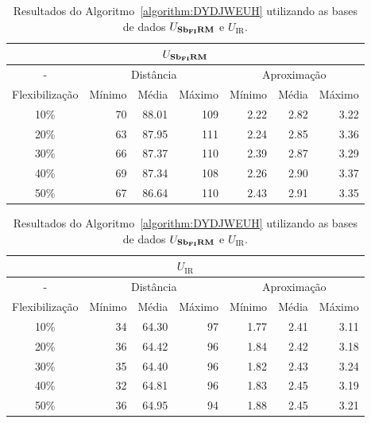\begin{table}[!htb]
  \caption{Resultados do Algoritmo~\ref{algorithm:DYDJWEUH} utilizando as bases de dados $U_{\textbf{Sb\textsubscript{FI}RM}}{}$ e $U_{\text{IR}}$.}
  \label{table:IEBGYPHS}
  \centering
  \begin{tabular}{|c|r|r|r|r|r|r|}
    \hline
    \multicolumn{7}{|c|}{$U_{\textbf{Sb\textsubscript{FI}RM}}{}$}                                                                      \\ \hline
      -            & \multicolumn{3}{c|}{Distância}             & \multicolumn{3}{c|}{Aproximação}           \\ \hline
    Flexibilização & Mínimo       & Média        & Máximo       & Mínimo       & Média        & Máximo       \\ \hline  
    10\%           & 70           & 88.01        & 109          & 2.22         & 2.82         & 3.22         \\ \hline
    20\%           & 63           & 87.95        & 111          & 2.24         & 2.85         & 3.36         \\ \hline
    30\%           & 66           & 87.37        & 110          & 2.39         & 2.87         & 3.29         \\ \hline
    40\%           & 69           & 87.34        & 108          & 2.26         & 2.90         & 3.37         \\ \hline
    50\%           & 67           & 86.64        & 110          & 2.43         & 2.91         & 3.35         \\ \hline    
  \end{tabular}

  \vspace{5mm}

  \begin{tabular}{|c|r|r|r|r|r|r|}
    \hline
    \multicolumn{7}{|c|}{$U_{\text{IR}}$}                                                                    \\ \hline
      -            & \multicolumn{3}{c|}{Distância}             & \multicolumn{3}{c|}{Aproximação}           \\ \hline
    Flexibilização & Mínimo       & Média        & Máximo       & Mínimo       & Média        & Máximo       \\ \hline  
    10\%           & 34           & 64.30        & 97           & 1.77         & 2.41         & 3.11         \\ \hline
    20\%           & 36           & 64.42        & 96           & 1.84         & 2.42         & 3.18         \\ \hline
    30\%           & 35           & 64.40        & 96           & 1.82         & 2.43         & 3.24         \\ \hline
    40\%           & 32           & 64.81        & 96           & 1.83         & 2.45         & 3.19         \\ \hline
    50\%           & 36           & 64.95        & 94           & 1.88         & 2.45         & 3.21         \\ \hline    
  \end{tabular}
\end{table}



